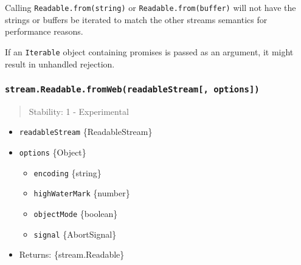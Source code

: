 Calling \texttt{Readable.from(string)} or \texttt{Readable.from(buffer)}
will not have the strings or buffers be iterated to match the other
streams semantics for performance reasons.

If an \texttt{Iterable} object containing promises is passed as an
argument, it might result in unhandled rejection.

\begin{Shaded}
\begin{Highlighting}[]
\OperatorTok{=} \NormalTok{(}\NormalTok{)}\OperatorTok{;}

\NormalTok{([}
   \KeywordTok{=\textgreater{}} \NormalTok{(}\NormalTok{(}\StringTok{\textquotesingle{}1\textquotesingle{}}\NormalTok{)}\OperatorTok{,} \NormalTok{))}\OperatorTok{,}
   \NormalTok{((\_}\OperatorTok{,}\KeywordTok{=\textgreater{}} \NormalTok{(}\NormalTok{(} \NormalTok{(}\StringTok{\textquotesingle{}2\textquotesingle{}}\NormalTok{))}\OperatorTok{,} \NormalTok{))}\OperatorTok{,} 
\NormalTok{])}\OperatorTok{;}
\end{Highlighting}
\end{Shaded}

\subsubsection{\texorpdfstring{\texttt{stream.Readable.fromWeb(readableStream{[},\ options{]})}}{stream.Readable.fromWeb(readableStream{[}, options{]})}}\label{stream.readable.fromwebreadablestream-options}

\begin{quote}
Stability: 1 - Experimental
\end{quote}

\begin{itemize}
\tightlist
\item
  \texttt{readableStream} \{ReadableStream\}
\item
  \texttt{options} \{Object\}

  \begin{itemize}
  \tightlist
  \item
    \texttt{encoding} \{string\}
  \item
    \texttt{highWaterMark} \{number\}
  \item
    \texttt{objectMode} \{boolean\}
  \item
    \texttt{signal} \{AbortSignal\}
  \end{itemize}
\item
  Returns: \{stream.Readable\}
\end{itemize}

